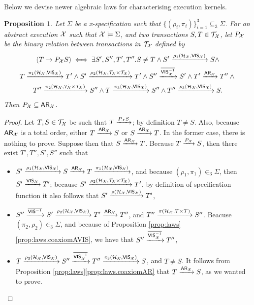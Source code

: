 \documentclass[a4paper,UKenglish]{article}%
\theoremstyle{plain}
\newtheorem{proposition}[theorem]{Proposition}
\begin{document}
Below we devise newer algebraic laws for characterising execution kernels.

\begin{proposition}
Let $\Sigma$ be a x-specification such that $\{(\rho_i, \pi_i)\}_{i=1}^{3} \subseteq_3 \Sigma$.
For an abstract execution $\mathcal{X}$ such that $\mathcal{X} \models \Sigma$, and two transactions 
$S,T \in \mathcal{T}_{\mathcal{X}}$, let $P_{\mathcal{X}}$ be the binary relation between transactions in $\mathcal{T}_{\mathcal{X}}$ defined by 
\begin{multline*} 
  (T \rightarrow{P_{\mathcal{X}}} S) \iff \exists S',S'',T',T''. S \neq T \wedge S' \xrightarrow{\rho_1(\mathcal{H}_{\mathcal{X}}, {\mathsf{VIS}}_{\mathcal{X}})} S \wedge \\
    T \xrightarrow{\pi_1(\mathcal{H}_{\mathcal{X}}, {\mathsf{VIS}}_{\mathcal{X}})} T' \wedge 
    S' \xrightarrow{\rho_2(\mathcal{H}_{\mathcal{X}}, \mathcal{T}_{\mathcal{X}} \times \mathcal{T}_{\mathcal{X}})} T' \wedge 
    S'' \xrightarrow{\overline{{\mathsf{VIS}}_{\mathcal{X}}^{-1}}} S' \wedge T' \xrightarrow{{\sf{AR}}_{\mathcal{X}}} T'' \wedge{}\\
    T'' \xrightarrow{\pi_2(\mathcal{H}_{\mathcal{X}}, \mathcal{T}_{\mathcal{X}} \times \mathcal{T}_{\mathcal{X}})} S'' \wedge 
    T \xrightarrow{\pi_3(\mathcal{H}_{\mathcal{X}}, {\mathsf{VIS}}_{\mathcal{X}})} S'' \wedge 
    T'' \xrightarrow{\rho_3(\mathcal{H}_{\mathcal{X}}, {\mathsf{VIS}}_{\mathcal{X}})} S. 
\end{multline*}
Then $P_{\mathcal{X}} \subseteq {\sf{AR}}_{\mathcal{X}}$.
\end{proposition}

\begin{proof}
Let $T,S \in \mathcal{T}_{\mathcal{X}}$ be such that $T \xrightarrow{P_{\mathcal{X}} S}$; by definition 
$T \neq S$. Also, because ${\sf{AR}}_{\mathcal{X}}$ is a total order, either $T \xrightarrow{{\sf{AR}}_{\mathcal{X}}} S$ or 
$S \xrightarrow{{\sf{AR}}_{\mathcal{X}}} T$. In the former case, there is nothing to prove. 
Suppose then that $S \xrightarrow{{\sf{AR}}_{\mathcal{X}}} T$. Because $T \xrightarrow{P_{\mathcal{X}}} S$, then there 
exist $T',T'',S',S''$ such that
\begin{itemize}
\item $S' \xrightarrow{\rho_1(\mathcal{H}_{\mathcal{X}}, {\mathsf{VIS}}_{\mathcal{X}})} S \xrightarrow{{\sf{AR}}_{\mathcal{X}}} T \xrightarrow{\pi_1(\mathcal{H}_{\mathcal{X}}, {\mathsf{VIS}}_{\mathcal{X}})}$, 
and because $(\rho_1, \pi_1) \in_3 \Sigma$, then $S' \xrightarrow{{\mathsf{VIS}}_{\mathcal{X}}} T'$; because $S' \xrightarrow{\rho_2(\mathcal{H}_{\mathcal{X}}, \mathcal{T}_{\mathcal{X}} \times \mathcal{T}_{\mathcal{X}})} T'$, 
by definition of specification function it also follows that $S' \xrightarrow{\rho(\mathcal{H}_{\mathcal{X}}, {\mathsf{VIS}}_{\mathcal{X}})} T'$, 
\item $S'' \xrightarrow{\overline{{\mathsf{VIS}}^{-1}}} S' \xrightarrow{\rho_2(\mathcal{H}_{\mathcal{X}}, {\mathsf{VIS}}_{\mathcal{X}})} T' \xrightarrow{{\sf{AR}}_{\mathcal{X}}} T''$, and 
$T'' \xrightarrow{\pi(\mathcal{H}_{\mathcal{X}}, \mathcal{T} \times \mathcal{T})} S''$. Beacuse $(\pi_2, \rho_2) \in_3 \Sigma$, and because of Proposition \ref{prop:laws}\eqref{prop:laws.coaxiomAVIS}, 
we have that $S'' \xrightarrow{\overline{{\mathsf{VIS}}_{\mathcal{X}}^{-1}}} T''$,
\item $T \xrightarrow{\rho_3(\mathcal{H}_{\mathcal{X}}, {\mathsf{VIS}}_{\mathcal{X}})} S'' \xrightarrow{\overline{{\mathsf{VIS}}_{\mathcal{X}}^{-1}}} T'' \xrightarrow{\pi_3(\mathcal{H}_{\mathcal{X}}, {\mathsf{VIS}}_{\mathcal{X}})} S$, 
and $T \neq S$. It follows from Proposition \ref{prop:laws}\eqref{prop:laws.coaxiomAR} that $T \xrightarrow{{\sf{AR}}_{\mathcal{X}}} S$, as we wanted to prove. 
\end{itemize} 
\end{proof}
\end{document}
